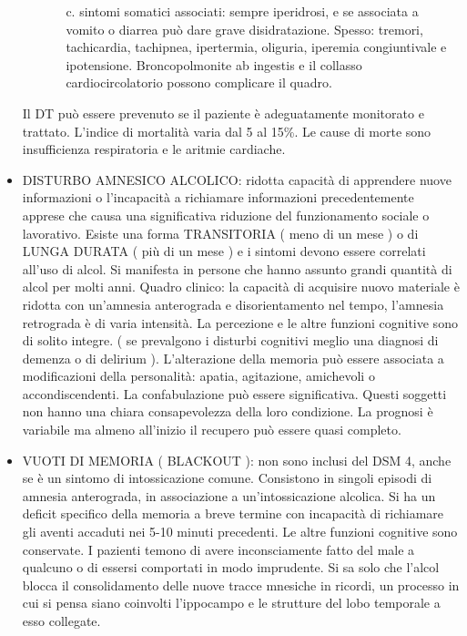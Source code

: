 \begin{itemize}
\begin{itemize}
\begin{itemize}
\item[c.]
  sintomi somatici associati: sempre iperidrosi, e se associata a
  vomito o diarrea può dare grave disidratazione. Spesso: tremori,
  tachicardia, tachipnea, ipertermia, oliguria, iperemia congiuntivale e
  ipotensione. Broncopolmonite ab ingestis e il collasso
  cardiocircolatorio possono complicare il quadro.
  
\end{itemize}
\end{itemize}
Il DT può essere prevenuto se il paziente è adeguatamente monitorato e
trattato. L'indice di mortalità varia dal 5 al 15\%. Le cause di morte
sono insufficienza respiratoria e le aritmie cardiache.

\item DISTURBO AMNESICO ALCOLICO: ridotta capacità di apprendere nuove
informazioni o l'incapacità a richiamare informazioni precedentemente
apprese che causa una significativa riduzione del funzionamento sociale
o lavorativo. Esiste una forma TRANSITORIA ( meno di un mese ) o di
LUNGA DURATA ( più di un mese ) e i sintomi devono essere correlati
all'uso di alcol. Si manifesta in persone che hanno assunto grandi
quantità di alcol per molti anni. Quadro clinico: la capacità di
acquisire nuovo materiale è ridotta con un'amnesia anterograda e
disorientamento nel tempo, l'amnesia retrograda è di varia intensità. La
percezione e le altre funzioni cognitive sono di solito integre. ( se
prevalgono i disturbi cognitivi meglio una diagnosi di demenza o di
delirium ). L'alterazione della memoria può essere associata a
modificazioni della personalità: apatia, agitazione, amichevoli o
accondiscendenti. La confabulazione può essere significativa. Questi
soggetti non hanno una chiara consapevolezza della loro condizione. La
prognosi è variabile ma almeno all'inizio il recupero può essere quasi
completo.

\item VUOTI DI MEMORIA ( BLACKOUT ): non sono inclusi del DSM 4, anche se è
un sintomo di intossicazione comune. Consistono in singoli episodi di
amnesia anterograda, in associazione a un'intossicazione alcolica. Si ha
un deficit specifico della memoria a breve termine con incapacità di
richiamare gli aventi accaduti nei 5-10 minuti precedenti. Le altre
funzioni cognitive sono conservate. I pazienti temono di avere
inconsciamente fatto del male a qualcuno o di essersi comportati in modo
imprudente. Si sa solo che l'alcol blocca il consolidamento delle nuove
tracce mnesiche in ricordi, un processo in cui si pensa siano coinvolti
l'ippocampo e le strutture del lobo temporale a esso collegate.


\end{itemize}
